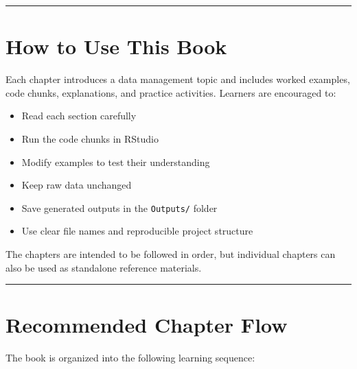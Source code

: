 \documentclass[
  11pt,
  oneside]{book}
\providecommand{\tightlist}{%
  \setlength{\itemsep}{0pt}\setlength{\parskip}{0pt}}
\begin{document}
\begin{center}\rule{0.5\linewidth}{0.5pt}\end{center}

\chapter*{How to Use This Book}\label{how-to-use-this-book}

Each chapter introduces a data management topic and includes worked examples, code chunks, explanations, and practice activities. Learners are encouraged to:

\begin{itemize}
\tightlist
\item
  Read each section carefully
\item
  Run the code chunks in RStudio
\item
  Modify examples to test their understanding
\item
  Keep raw data unchanged
\item
  Save generated outputs in the \texttt{Outputs/} folder
\item
  Use clear file names and reproducible project structure
\end{itemize}

The chapters are intended to be followed in order, but individual chapters can also be used as standalone reference materials.

\begin{center}\rule{0.5\linewidth}{0.5pt}\end{center}

\chapter*{Recommended Chapter Flow}\label{recommended-chapter-flow}

The book is organized into the following learning sequence:
\end{document}
